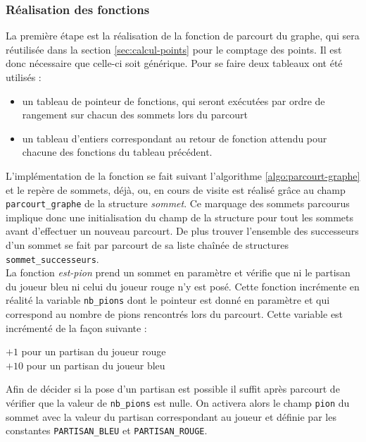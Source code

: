 \documentclass[a4paper, 11pt]{article}
\begin{document}
		


		\subsubsection{Réalisation des fonctions}\label{sec:pose-partisan-c}
			\indent La première étape est la réalisation de la fonction de parcourt du graphe, qui sera réutilisée dans la section \ref{sec:calcul-points} pour le comptage des points. Il est donc nécessaire que celle-ci soit générique. Pour se faire deux tableaux ont été utilisés : 
			\begin{itemize}
				\item un tableau de pointeur de fonctions, qui seront exécutées par ordre de rangement sur chacun des sommets lors du parcourt			
				\item un tableau d'entiers correspondant au retour de fonction attendu pour chacune des fonctions du tableau précédent.
			\end{itemize}
			L'implémentation de la fonction se fait suivant l'algorithme \ref{algo:parcourt-graphe} et le repère de sommets, déjà, ou, en cours de visite est réalisé grâce au champ \verb!parcourt_graphe! de la structure \emph{sommet}. Ce marquage des sommets parcourus implique donc une initialisation du champ de la structure pour tout les sommets avant d'effectuer un nouveau parcourt. De plus trouver l'ensemble des successeurs d'un sommet se fait par parcourt de sa liste chaînée de structures \verb!sommet_successeurs!. \\
			\indent La fonction \emph{est-pion} prend un sommet en paramètre et vérifie que ni le partisan du joueur bleu ni celui du joueur rouge n'y est posé. Cette fonction incrémente en réalité la variable \verb!nb_pions! dont le pointeur est donné en paramètre et qui correspond au nombre de pions rencontrés lors du parcourt. Cette variable est incrémenté de la façon suivante : 
			\begin{center}
				$+ 1$ pour un partisan du joueur rouge \\
				$+ 10$ pour un partisan du joueur bleu
			\end{center}
			Afin de décider si la pose d'un partisan est possible il suffit après parcourt de vérifier que la valeur de \verb!nb_pions! est nulle. On activera alors le champ \verb!pion! du sommet avec la valeur du partisan correspondant au joueur et définie par les constantes \verb!PARTISAN_BLEU! et \verb!PARTISAN_ROUGE!.
\end{document}
